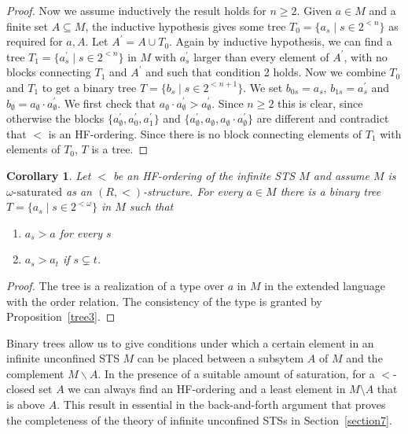 \documentclass[a4paper, 11pt]{article}
\theoremstyle{note}
\newtheorem{cor}[thm]{Corollary}
\begin{document}
\begin{proof}
	
	Now we assume inductively the result holds for $n\geq 2$.
	Given $a\in M$ and a finite set $A\subseteq M$, the inductive hypothesis gives some tree $T_0=\{a_s\mid s\in 2^{<n}\}$ as required for $a,A$.  Let $A^\prime =A\cup T_0$. Again by inductive hypothesis, we can find a tree $T_1=\{a^\prime_s\mid s\in 2^{<n}\}$ in $M$  with $a^\prime_s$ larger than every element of $A^\prime$, with no blocks connecting $T_1$ and $A^\prime$  and such that condition 2 holds. Now we combine $T_0$ and $T_1$ to get a binary tree $T=\{b_s \mid s\in 2^{<n+1}\}$. We set $b_{0s}= a_s$, $b_{1s}= a^\prime_s$  and  $b_\emptyset = a_\emptyset\cdot a^\prime_\emptyset$.  We first  check that   $a_\emptyset\cdot a^\prime_\emptyset > a^\prime_\emptyset$. Since $n\geq 2$ this is clear, since otherwise the blocks $\{a^\prime_\emptyset,a^\prime_0,a^\prime_1\}$  and  $\{a^\prime_\emptyset, a_\emptyset, a_\emptyset \cdot a^\prime_\emptyset\}$ are different and contradict that $<$ is an HF-ordering. Since there is no block connecting elements of $T_1$ with elements of $T_0$, $T$ is a tree.
\end{proof}

\begin{cor}\label{tree4}
	Let $<$ be an HF-ordering of the infinite STS $M$ and assume %
	$M$ is $\text{$\omega$-saturated}$ as an $(R, <)$-structure.  For every $a\in M$    there is a binary tree $T=\{a_s\mid s\in 2^{<\omega}\}$  in $M$ such that
	\begin{enumerate}
		\item $a_s>a$  for every $s$
		\item $a_s>a_t$  if  $s\subsetneq t$.
	\end{enumerate}
\end{cor}
\begin{proof}
	The tree is a realization of a type over $a$ in $M$ in the extended language with the order relation. The consistency of the type is granted by Proposition~\ref{tree3}.
\end{proof}

 Binary trees allow us to give conditions under which a certain element in an infinite unconfined STS $M$ can be placed between a subsytem $A$ of $M$ and the complement $M \smallsetminus A$. In the presence of a suitable amount of saturation, for a $<$-closed set $A$ we can always find an HF-ordering and a least element in $M \setminus A$ that is above $A$. This result in essential in the back-and-forth argument that proves the completeness of the theory of infinite unconfined STSs in Section~\ref{section7}.
\end{document}
